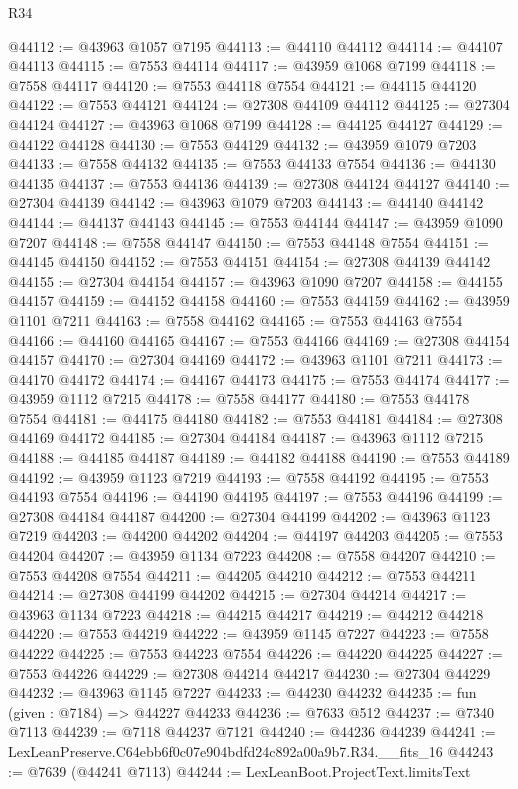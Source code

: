 \begin{lexlean}{R34}
\begin{coremodule}
@44112 := @43963 @1057 @7195
@44113 := @44110 @44112
@44114 := @44107 @44113
@44115 := @7553 @44114
@44117 := @43959 @1068 @7199
@44118 := @7558 @44117
@44120 := @7553 @44118 @7554
@44121 := @44115 @44120
@44122 := @7553 @44121
@44124 := @27308 @44109 @44112
@44125 := @27304 @44124
@44127 := @43963 @1068 @7199
@44128 := @44125 @44127
@44129 := @44122 @44128
@44130 := @7553 @44129
@44132 := @43959 @1079 @7203
@44133 := @7558 @44132
@44135 := @7553 @44133 @7554
@44136 := @44130 @44135
@44137 := @7553 @44136
@44139 := @27308 @44124 @44127
@44140 := @27304 @44139
@44142 := @43963 @1079 @7203
@44143 := @44140 @44142
@44144 := @44137 @44143
@44145 := @7553 @44144
@44147 := @43959 @1090 @7207
@44148 := @7558 @44147
@44150 := @7553 @44148 @7554
@44151 := @44145 @44150
@44152 := @7553 @44151
@44154 := @27308 @44139 @44142
@44155 := @27304 @44154
@44157 := @43963 @1090 @7207
@44158 := @44155 @44157
@44159 := @44152 @44158
@44160 := @7553 @44159
@44162 := @43959 @1101 @7211
@44163 := @7558 @44162
@44165 := @7553 @44163 @7554
@44166 := @44160 @44165
@44167 := @7553 @44166
@44169 := @27308 @44154 @44157
@44170 := @27304 @44169
@44172 := @43963 @1101 @7211
@44173 := @44170 @44172
@44174 := @44167 @44173
@44175 := @7553 @44174
@44177 := @43959 @1112 @7215
@44178 := @7558 @44177
@44180 := @7553 @44178 @7554
@44181 := @44175 @44180
@44182 := @7553 @44181
@44184 := @27308 @44169 @44172
@44185 := @27304 @44184
@44187 := @43963 @1112 @7215
@44188 := @44185 @44187
@44189 := @44182 @44188
@44190 := @7553 @44189
@44192 := @43959 @1123 @7219
@44193 := @7558 @44192
@44195 := @7553 @44193 @7554
@44196 := @44190 @44195
@44197 := @7553 @44196
@44199 := @27308 @44184 @44187
@44200 := @27304 @44199
@44202 := @43963 @1123 @7219
@44203 := @44200 @44202
@44204 := @44197 @44203
@44205 := @7553 @44204
@44207 := @43959 @1134 @7223
@44208 := @7558 @44207
@44210 := @7553 @44208 @7554
@44211 := @44205 @44210
@44212 := @7553 @44211
@44214 := @27308 @44199 @44202
@44215 := @27304 @44214
@44217 := @43963 @1134 @7223
@44218 := @44215 @44217
@44219 := @44212 @44218
@44220 := @7553 @44219
@44222 := @43959 @1145 @7227
@44223 := @7558 @44222
@44225 := @7553 @44223 @7554
@44226 := @44220 @44225
@44227 := @7553 @44226
@44229 := @27308 @44214 @44217
@44230 := @27304 @44229
@44232 := @43963 @1145 @7227
@44233 := @44230 @44232
@44235 := fun (given : @7184) => @44227 @44233
@44236 := @7633 @512
@44237 := @7340 @7113
@44239 := @7118 @44237 @7121
@44240 := @44236 @44239
@44241 := LexLeanPreserve.C64ebb6f0c07e904bdfd24c892a00a9b7.R34.__fits_16
@44243 := @7639 (@44241 @7113)
@44244 := LexLeanBoot.ProjectText.limitsText

\end{coremodule}
\end{lexlean}

